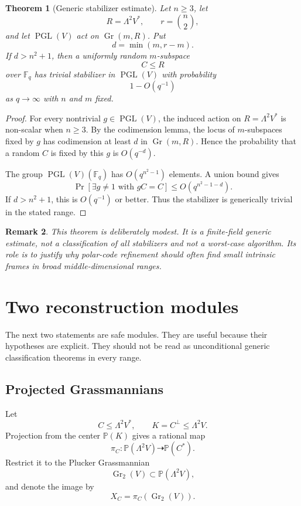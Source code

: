 \documentclass[11pt]{article}
\newtheorem{theorem}{Theorem}[section]
\newtheorem{remark}[theorem]{Remark}
\begin{document}
\begin{theorem}[Generic stabilizer estimate]
Let $n\ge3$, let
\[
R=\Lambda^2V^*,
\qquad r=\binom n2,
\]
and let $\operatorname{PGL}(V)$ act on $\operatorname{Gr}(m,R)$. Put
\[
d=\min(m,r-m).
\]
If $d>n^2+1$, then a uniformly random $m$-subspace
\[
C\le R
\]
over $\mathbb F_q$ has trivial stabilizer in $\operatorname{PGL}(V)$ with probability
\[
1-O(q^{-1})
\]
as $q\to\infty$ with $n$ and $m$ fixed.
\end{theorem}

\begin{proof}
For every nontrivial $g\in\operatorname{PGL}(V)$, the induced action on $R=\Lambda^2V^*$ is non-scalar when $n\ge3$. By the codimension lemma, the locus of $m$-subspaces fixed by $g$ has codimension at least $d$ in $\operatorname{Gr}(m,R)$. Hence the probability that a random $C$ is fixed by this $g$ is $O(q^{-d})$.

The group $\operatorname{PGL}(V)(\mathbb F_q)$ has $O(q^{n^2-1})$ elements. A union bound gives
\[
\Pr[\exists g\ne1\text{ with }gC=C]
\le
O(q^{n^2-1-d}).
\]
If $d>n^2+1$, this is $O(q^{-1})$ or better. Thus the stabilizer is generically trivial in the stated range.
\end{proof}

\begin{remark}
This theorem is deliberately modest. It is a finite-field generic estimate, not a classification of all stabilizers and not a worst-case algorithm. Its role is to justify why polar-code refinement should often find small intrinsic frames in broad middle-dimensional ranges.
\end{remark}

\section{Two reconstruction modules}

The next two statements are safe modules. They are useful because their hypotheses are explicit. They should not be read as unconditional generic classification theorems in every range.

\subsection{Projected Grassmannians}

Let
\[
C\le\Lambda^2V^*,
\qquad
K=C^\perp\le\Lambda^2V.
\]
Projection from the center $\mathbb P(K)$ gives a rational map
\[
\pi_C:\mathbb P(\Lambda^2V)\dashrightarrow\mathbb P(C^*).
\]
Restrict it to the Plucker Grassmannian
\[
\operatorname{Gr}_2(V)\subset\mathbb P(\Lambda^2V),
\]
and denote the image by
\[
X_C=\pi_C(\operatorname{Gr}_2(V)).
\]
\end{document}
